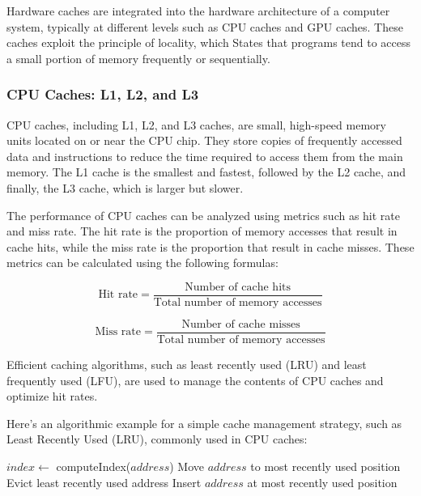 \documentclass[12pt]{book} %
\begin{document}
Hardware caches are integrated into the hardware architecture of a computer system, typically at different levels such as CPU caches and GPU caches. These caches exploit the principle of locality, which States that programs tend to access a small portion of memory frequently or sequentially.

\subsubsection{CPU Caches: L1, L2, and L3}

CPU caches, including L1, L2, and L3 caches, are small, high-speed memory units located on or near the CPU chip. They store copies of frequently accessed data and instructions to reduce the time required to access them from the main memory. The L1 cache is the smallest and fastest, followed by the L2 cache, and finally, the L3 cache, which is larger but slower.

The performance of CPU caches can be analyzed using metrics such as hit rate and miss rate. The hit rate is the proportion of memory accesses that result in cache hits, while the miss rate is the proportion that result in cache misses. These metrics can be calculated using the following formulas:

\[
\text{Hit rate} = \frac{\text{Number of cache hits}}{\text{Total number of memory accesses}}
\]

\[
\text{Miss rate} = \frac{\text{Number of cache misses}}{\text{Total number of memory accesses}}
\]

Efficient caching algorithms, such as least recently used (LRU) and least frequently used (LFU), are used to manage the contents of CPU caches and optimize hit rates.

Here's an algorithmic example for a simple cache management strategy, such as Least Recently Used (LRU), commonly used in CPU caches:
\FloatBarrier
\begin{algorithm}[H]
\caption{Least Recently Used (LRU) Cache Management}
\begin{algorithmic}[1]
\State $index \gets$ computeIndex($address$)
    \State Move $address$ to most recently used position
\Else
        \State Evict least recently used address
    \EndIf
    \State Insert $address$ at most recently used position
\EndIf
\EndFunction
\end{algorithmic}
\end{algorithm}
\end{document}

